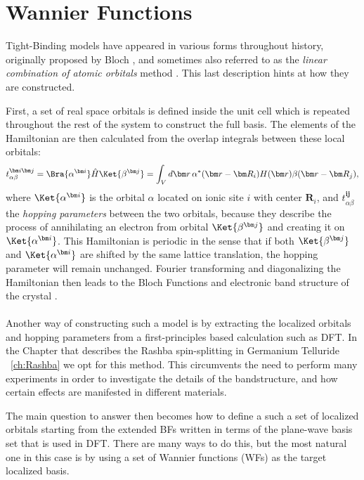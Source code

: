 \section{Wannier Functions \label{sec:Wannier}}
Tight-Binding models have appeared in various forms throughout history, originally proposed by Bloch \cite{Bloch1929}, and sometimes also referred to as the {\it linear combination of atomic orbitals} method \cite{Slater1954}.
This last description hints at how they are constructed.

First, a set of real space orbitals is defined inside the unit cell which is repeated throughout the rest of the system to construct the full basis.
The elements of the Hamiltonian are then calculated from the overlap integrals between these local orbitals:
\begin{equation}
	t^{\bm i \bm j}_{\alpha \beta} = \Bra{\alpha^{\bm i}} \hat{H} \Ket{\beta^{\bm j}} = \int_{V} d\bm r\, \alpha^*(\bm r - \bm R_i) H(\bm r) \beta(\bm r - \bm R_j),
\end{equation}
where $\Ket{\alpha^{\bm i}}$ is the orbital $\alpha$ located on ionic site $i$ with center $\bm R_i$, and $t^{\bm i \bm j}_{\alpha \beta}$ the {\it hopping parameters} between the two orbitals, because they describe the process of annihilating an electron from orbital $\Ket{\beta^{\bm j}}$ and creating it on $\Ket{\alpha^{\bm i}}$.
This Hamiltonian is periodic in the sense that if both $\Ket{\beta^{\bm j}}$ and $\Ket{\alpha^{\bm i}}$ are shifted by the same lattice translation, the hopping parameter will remain unchanged.
Fourier transforming and diagonalizing the Hamiltonian then leads to the Bloch Functions and electronic band structure of the crystal \cite{Ashcroft}.
\\\\
Another way of constructing such a model is by extracting the localized orbitals and hopping parameters from a first-principles based calculation such as DFT. In the Chapter that describes the Rashba spin-splitting in Germanium Telluride ~\ref{ch:Rashba} we opt for this method.
This circumvents the need to perform many experiments in order to investigate the details of the bandstructure, and how certain effects are manifested in different materials. 

The main question to answer then becomes how to define a such a set of localized orbitals starting from the extended BFs written in terms of the plane-wave basis set that is used in DFT.
There are many ways to do this, but the most natural one in this case is by using a set of Wannier functions (WFs) \cite{Wannier1937} as the target localized basis.

